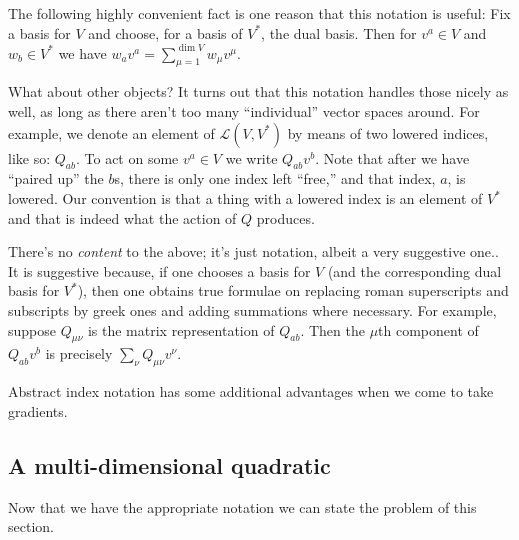 \documentclass[10pt, a4paper]{article}
\begin{document}
The following highly convenient fact is one reason that this notation
is useful: Fix a basis for $V$ and choose, for a basis of $V^*$, the
dual basis. Then for $v^a\in V$ and $w_b\in V^*$ we have
$w_av^a = \sum_{\mu=1}^{\dim V} w_\mu v^\mu$.


What about other objects? It turns out that this notation handles
those nicely as well, as long as there aren't too many “individual”
vector spaces around. For example, we denote an element of
$\mathcal{L}(V,V^*)$ by means of two lowered indices, like so:
$Q_{ab}$. To act on some $v^a\in V$ we write $Q_{ab}v^b$. Note that
after we have “paired up” the $b$s, there is only one index left
“free,” and that index, $a$, is lowered. Our convention is that a
thing with a lowered index is an element of $V^*$ and that is indeed
what the action of $Q$ produces.

There's no \emph{content} to the above; it's just notation, albeit a
very suggestive one.. It is suggestive because, if one chooses a basis
for $V$ (and the corresponding dual basis for $V^*$), then one obtains
true formulae on replacing roman superscripts and subscripts by greek
ones and adding summations where necessary. For example, suppose
$Q_{\mu\nu}$ is the matrix representation of $Q_{ab}$. Then the
$\mu$th component of $Q_{ab}v^b$ is precisely $\sum_\nu Q_{\mu\nu}v^\nu$.

Abstract index notation has some additional advantages when we come to
take gradients.

\subsection{A multi-dimensional quadratic}

Now that we have the appropriate notation we can state the problem of
this section.
\end{document}
